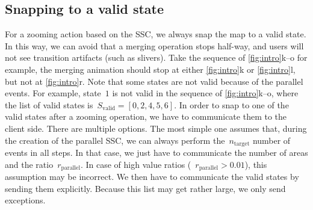\documentclass{ica}
\begin{document}
\subsection{Snapping to a valid state}
\label{sec:snap}

For a zooming action based on the SSC, 
we always snap the map to a valid state.
In this way, we can avoid that a merging operation stops half-way,
and users will not see transition artifacts (such as slivers).
Take the sequence of \fig\ref{fig:intro}k--o for example, 
the merging animation should stop at 
either \ref{fig:intro}k or \ref{fig:intro}l,
but not at \ref{fig:intro}r.
Note that some states are not valid because of the parallel events.
For example, state~$1$ is not valid 
in the sequence of \fig\ref{fig:intro}k--o,
where the list of valid states 
is~$S_\mathrm{valid} = [0, 2, 4, 5, 6]$.
In order to snap to one of the valid states after a zooming operation,
we have to communicate them to the client side. 
There are multiple options. 
The most simple one assumes that, 
during the creation of the parallel SSC, 
we can always perform 
the~$n_\mathrm{target}$ number of events in all steps. 
In that case, we just have to communicate 
the number of areas and the ratio~$r_\mathrm{parallel}$. 
In case of high value ratios (\eg~$r_\mathrm{parallel} > 0.01$), 
this assumption may be incorrect. 
We then have to communicate the valid states by sending them explicitly. 
Because this list may get rather large,
we only send exceptions.
\end{document}
